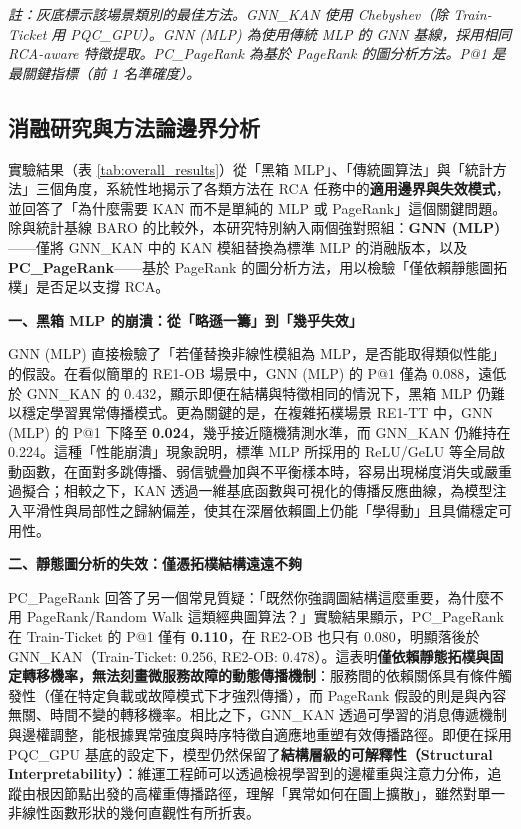 \documentclass[10pt,a4paper,twocolumn]{article}
\begin{document}
\begin{table}[htbp]
\small \textit{註：灰底標示該場景類別的最佳方法。GNN\_KAN 使用 Chebyshev（除 Train-Ticket 用 PQC\_GPU）。GNN (MLP) 為使用傳統 MLP 的 GNN 基線，採用相同 RCA-aware 特徵提取。PC\_PageRank 為基於 PageRank 的圖分析方法。P@1 是最關鍵指標（前 1 名準確度）。}
\end{table}

\subsection{消融研究與方法論邊界分析}

實驗結果（表 \ref{tab:overall_results}）從「黑箱 MLP」、「傳統圖算法」與「統計方法」三個角度，系統性地揭示了各類方法在 RCA 任務中的\textbf{適用邊界與失效模式}，並回答了「為什麼需要 KAN 而不是單純的 MLP 或 PageRank」這個關鍵問題。除與統計基線 BARO 的比較外，本研究特別納入兩個強對照組：\textbf{GNN (MLP)}——僅將 GNN\_KAN 中的 KAN 模組替換為標準 MLP 的消融版本，以及 \textbf{PC\_PageRank}——基於 PageRank 的圖分析方法，用以檢驗「僅依賴靜態圖拓樸」是否足以支撐 RCA。

\textbf{一、黑箱 MLP 的崩潰：從「略遜一籌」到「幾乎失效」}

GNN (MLP) 直接檢驗了「若僅替換非線性模組為 MLP，是否能取得類似性能」的假設。在看似簡單的 RE1-OB 場景中，GNN (MLP) 的 P@1 僅為 0.088，遠低於 GNN\_KAN 的 0.432，顯示即便在結構與特徵相同的情況下，黑箱 MLP 仍難以穩定學習異常傳播模式。更為關鍵的是，在複雜拓樸場景 RE1-TT 中，GNN (MLP) 的 P@1 下降至 \textbf{0.024}，幾乎接近隨機猜測水準，而 GNN\_KAN 仍維持在 0.224。這種「性能崩潰」現象說明，標準 MLP 所採用的 ReLU/GeLU 等全局啟動函數，在面對多跳傳播、弱信號疊加與不平衡樣本時，容易出現梯度消失或嚴重過擬合；相較之下，KAN 透過一維基底函數與可視化的傳播反應曲線，為模型注入平滑性與局部性之歸納偏差，使其在深層依賴圖上仍能「學得動」且具備穩定可用性。

\textbf{二、靜態圖分析的失效：僅憑拓樸結構遠遠不夠}

PC\_PageRank 回答了另一個常見質疑：「既然你強調圖結構這麼重要，為什麼不用 PageRank/Random Walk 這類經典圖算法？」實驗結果顯示，PC\_PageRank 在 Train-Ticket 的 P@1 僅有 \textbf{0.110}，在 RE2-OB 也只有 0.080，明顯落後於 GNN\_KAN（Train-Ticket: 0.256, RE2-OB: 0.478）。這表明\textbf{僅依賴靜態拓樸與固定轉移機率，無法刻畫微服務故障的動態傳播機制}：服務間的依賴關係具有條件觸發性（僅在特定負載或故障模式下才強烈傳播），而 PageRank 假設的則是與內容無關、時間不變的轉移機率。相比之下，GNN\_KAN 透過可學習的消息傳遞機制與邊權調整，能根據異常強度與時序特徵自適應地重塑有效傳播路徑。即便在採用 PQC\_GPU 基底的設定下，模型仍然保留了\textbf{結構層級的可解釋性（Structural Interpretability）}：維運工程師可以透過檢視學習到的邊權重與注意力分佈，追蹤由根因節點出發的高權重傳播路徑，理解「異常如何在圖上擴散」，雖然對單一非線性函數形狀的幾何直觀性有所折衷。
\end{document}
